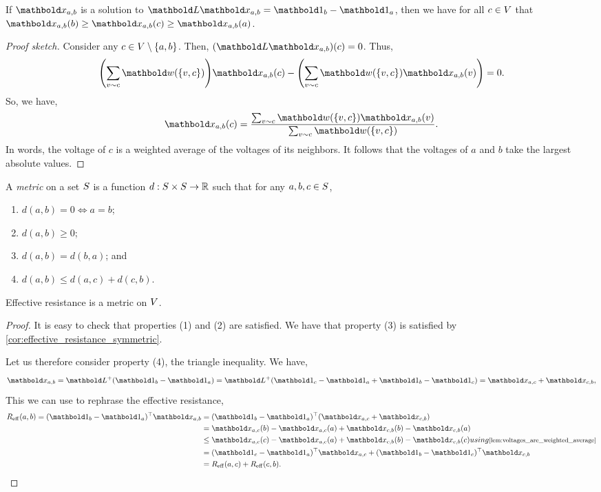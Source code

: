\begin{lem}\label{lem:voltages_are_weighted_average}
If $\vx_{a,b}$ is a solution to $\mL\vx_{a,b} = \vOne_b - \vOne_a$, then we have for all $c \in V$ that $\vx_{a,b}(b) \geq \vx_{a,b}(c) \geq \vx_{a,b}(a)$.
\end{lem}
\begin{proof}[Proof sketch] Consider any $c \in V \setminus \{a,b\}$. Then, $(\mL\vx_{a,b})(c) = 0$. Thus, \begin{align*}
    \parentheses*{\sum_{v \sim c} \vw(\{v,c\})} \vx_{a,b}(c) - \parentheses*{\sum_{v \sim c} \vw(\{v,c\}) \vx_{a,b}(v)} = 0.
\end{align*} So, we have, \begin{align*}
    \vx_{a,b}(c) = \frac{\sum_{v \sim c} \vw(\{v,c\}) \vx_{a,b}(v)}{\sum_{v \sim c} \vw(\{v,c\})}.
\end{align*} In words, the voltage of $c$ is a weighted average of the voltages of its neighbors. It follows that the voltages of $a$ and $b$ take the largest absolute values.
\end{proof}

\begin{defn}[Metric] A \emph{metric} on a set $S$ is a function $d : S \times S \to \mathbb{R}$ such that for any $a, b, c \in S$, \begin{enumerate}
    \item $d(a,b) = 0 \iff a = b$;
    \item $d(a,b) \geq 0$;
    \item $d(a,b) = d(b,a)$; and
    \item $d(a,b) \leq d(a,c) + d(c,b)$.
\end{enumerate}
\end{defn}
\begin{lem}
Effective resistance is a metric on $V$.
\end{lem}
\begin{proof} It is easy to check that properties (1) and (2) are satisfied. We have that property (3) is satisfied by \cref{cor:effective_resistance_symmetric}.

Let us therefore consider property (4), the triangle inequality. We have, \begin{align*}
    \vx_{a,b} = \pinv{\mL}(\vOne_b - \vOne_a) = \pinv{\mL}(\vOne_c - \vOne_a + \vOne_b - \vOne_c) = \vx_{a,c} + \vx_{c,b},
\end{align*} This we can use to rephrase the effective resistance, \begin{align*}
    \Reff(a,b) = \trans{(\vOne_b - \vOne_a)}\vx_{a,b} &= \trans{(\vOne_b - \vOne_a)}(\vx_{a,c} + \vx_{c,b}) \\
    &= \vx_{a,c}(b) - \vx_{a,c}(a) + \vx_{c,b}(b) - \vx_{c,b}(a) \\
    &\leq \vx_{a,c}(c) - \vx_{a,c}(a) + \vx_{c,b}(b) - \vx_{c,b}(c) \margintag{using \cref{lem:voltages_are_weighted_average}} \\
    &= \trans{(\vOne_c - \vOne_a)}\vx_{a,c} + \trans{(\vOne_b - \vOne_c)}\vx_{c,b} \\
    &= \Reff(a,c) + \Reff(c,b). \qedhere
\end{align*}
\end{proof}